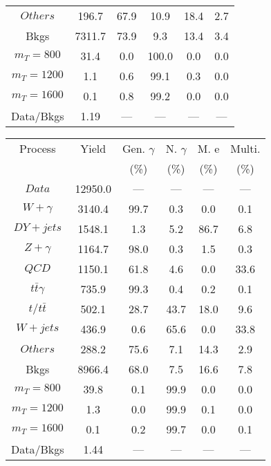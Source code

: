 \begin{figure}
\begin{minipage}[c]{0.32\textwidth}
{\begin{tabular}{cccccc}
$ Others $ &  196.7 &  67.9 &  10.9 &  18.4 &  2.7\\
Bkgs &  7311.7 &  73.9 &  9.3 &  13.4 &  3.4\\
$ m_{T} = 800 $ &  31.4 &  0.0 &  100.0 &  0.0 &  0.0\\
$ m_{T} = 1200 $ &  1.1 &  0.6 &  99.1 &  0.3 &  0.0\\
$ m_{T} = 1600 $ &  0.1 &  0.8 &  99.2 &  0.0 &  0.0\\
Data/Bkgs &  1.19 &  --- &  --- &  --- &  ---\\
\hline
\end{tabular}
}
\end{minipage}
\begin{minipage}[c]{0.32\textwidth}
\centering
\tiny{
\begin{tabular}{cccccc}
\hline
Process & Yield & Gen. $\gamma$ & N. $\gamma$ & M. e & Multi. \\
 &  & (\%) & (\%) & (\%) & (\%)  \\
\hline
                                                                      $ Data $ &  12950.0 &  --- &  --- &  --- &  ---\\
$ W+\gamma $ &  3140.4 &  99.7 &  0.3 &  0.0 &  0.1\\
$ DY+jets $ &  1548.1 &  1.3 &  5.2 &  86.7 &  6.8\\
$ Z+\gamma $ &  1164.7 &  98.0 &  0.3 &  1.5 &  0.3\\
$ QCD $ &  1150.1 &  61.8 &  4.6 &  0.0 &  33.6\\
$ t\bar{t}\gamma $ &  735.9 &  99.3 &  0.4 &  0.2 &  0.1\\
$ t/t\bar{t} $ &  502.1 &  28.7 &  43.7 &  18.0 &  9.6\\
$ W+jets $ &  436.9 &  0.6 &  65.6 &  0.0 &  33.8\\
$ Others $ &  288.2 &  75.6 &  7.1 &  14.3 &  2.9\\
Bkgs &  8966.4 &  68.0 &  7.5 &  16.6 &  7.8\\
$ m_{T} = 800 $ &  39.8 &  0.1 &  99.9 &  0.0 &  0.0\\
$ m_{T} = 1200 $ &  1.3 &  0.0 &  99.9 &  0.1 &  0.0\\
$ m_{T} = 1600 $ &  0.1 &  0.2 &  99.7 &  0.0 &  0.1\\
Data/Bkgs &  1.44 &  --- &  --- &  --- &  ---\\
\hline
\end{tabular}
}
\end{minipage}
\begin{minipage}[c]{0.32\textwidth}
\centering

\end{minipage}
\end{figure}
